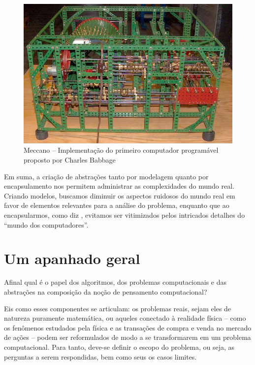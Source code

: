 \begin{figure}[!htb]
	\caption{Meccano -- Implementação do primeiro computador programável proposto por Charles Babbage }\label{fig:meccano}
	\begin{center}
		\includegraphics[scale=0.45]{imagens/babbage}
	\end{center}
\end{figure}

Em suma, a criação de abstrações tanto por modelagem quanto por encapsulamento nos permitem administrar as complexidades do mundo real. Criando modelos, buscamos diminuir os aspectos ruidosos do mundo real em favor de elementos relevantes para a análise do problema, enquanto que ao encapsularmos, como diz , evitamos ser vitimizados pelos intricados detalhes do ``mundo dos computadores''.

\section{Um apanhado geral}



Afinal qual é o papel dos algoritmos,  dos problemas computacionais e das abstrações na composição da noção de pensamento computacional?

Eis como esses componentes se articulam: os problemas reais, sejam eles de natureza puramente matemática, ou aqueles conectado à realidade física -- como os fenômenos estudados pela física e as transações de compra e venda no mercado de ações -- podem ser reformulados de modo a se transformarem em um problema computacional. Para tanto, deve-se definir o escopo do problema, ou seja, as perguntas a serem respondidas, bem como seus os casos limites. 

